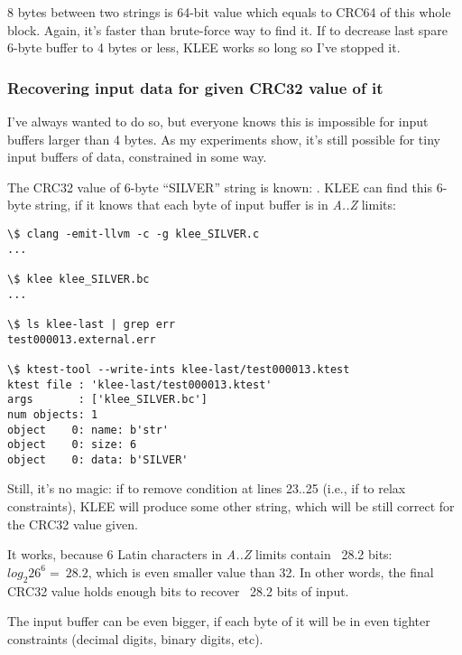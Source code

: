 8 bytes between two strings is 64-bit value which equals to CRC64 of this whole block.
Again, it's faster than brute-force way to find it.
If to decrease last spare 6-byte buffer to 4 bytes or less, KLEE works so long so I've stopped it.

\subsubsection{Recovering input data for given CRC32 value of it}

I've always wanted to do so, but everyone knows this is impossible for input buffers larger than 4 bytes.
As my experiments show, it's still possible for tiny input buffers of data, constrained in some way.

The CRC32 value of 6-byte ``SILVER'' string is known: .
KLEE can find this 6-byte string, if it knows that each byte of input buffer is in \textit{A..Z} limits:



\begin{lstlisting}
\$ clang -emit-llvm -c -g klee_SILVER.c
...

\$ klee klee_SILVER.bc
...

\$ ls klee-last | grep err
test000013.external.err

\$ ktest-tool --write-ints klee-last/test000013.ktest
ktest file : 'klee-last/test000013.ktest'
args       : ['klee_SILVER.bc']
num objects: 1
object    0: name: b'str'
object    0: size: 6
object    0: data: b'SILVER'
\end{lstlisting}

Still, it's no magic: if to remove condition at lines 23..25 (i.e., if to relax constraints),
KLEE will produce some other string, which will be still correct for the CRC32 value given.

It works, because 6 Latin characters in \textit{A..Z} limits contain ~28.2 bits: %
$log_2{26^6}=~28.2$, which is even smaller value than 32.
In other words, the final CRC32 value holds enough bits to recover ~28.2 bits of input.

The input buffer can be even bigger, if each byte of it will be in even tighter %
constraints (decimal digits, binary digits, etc).

